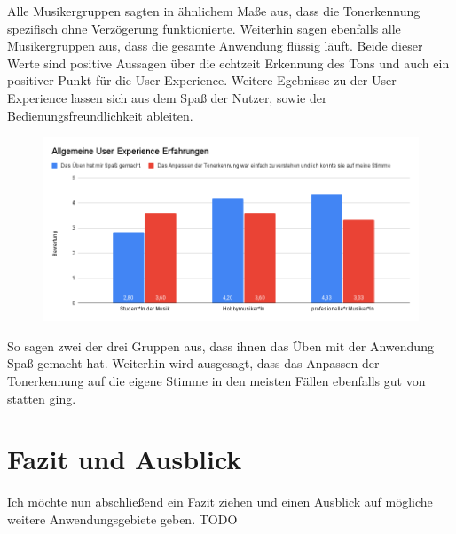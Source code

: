 Alle Musikergruppen sagten in ähnlichem Maße aus, dass die Tonerkennung spezifisch ohne Verzögerung funktionierte. Weiterhin sagen ebenfalls alle Musikergruppen aus, dass die gesamte Anwendung flüssig läuft. Beide dieser Werte sind positive Aussagen über die echtzeit Erkennung des Tons und auch ein positiver Punkt für die User Experience. Weitere Egebnisse zu der User Experience lassen sich aus dem Spaß der Nutzer, sowie der Bedienungsfreundlichkeit ableiten. 
\begin{figure}[H]
    \centering
    \includegraphics[width=1\textwidth]{Bilder/eval-zufriedenheitUX-vergleich.png}
\end{figure} 
So sagen zwei der drei Gruppen aus, dass ihnen das Üben mit der Anwendung Spaß gemacht hat. Weiterhin wird ausgesagt, dass das Anpassen der Tonerkennung auf die eigene Stimme in den meisten Fällen ebenfalls gut von statten ging. 

\chapter{Fazit und Ausblick}
Ich möchte nun abschließend ein Fazit ziehen und einen Ausblick auf mögliche weitere Anwendungsgebiete geben. 
TODO


